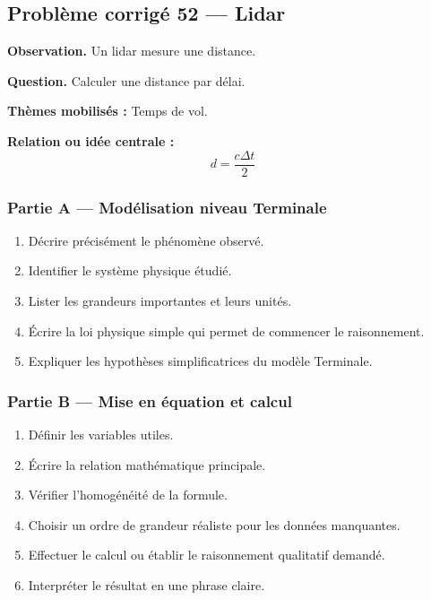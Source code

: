 \documentclass[11pt,a4paper]{article}
\begin{document}
\subsection{Problème corrigé 52 — Lidar}

\begin{exercicebox}
\textbf{Observation.} Un lidar mesure une distance.

\medskip
\textbf{Question.} Calculer une distance par délai.

\medskip
\textbf{Thèmes mobilisés :} Temps de vol.

\medskip
\textbf{Relation ou idée centrale :}
\[
d=\frac{c\Delta t}{2}
\]
\end{exercicebox}

\subsubsection*{Partie A — Modélisation niveau Terminale}

\begin{enumerate}
  \item Décrire précisément le phénomène observé.
  \item Identifier le système physique étudié.
  \item Lister les grandeurs importantes et leurs unités.
  \item Écrire la loi physique simple qui permet de commencer le raisonnement.
  \item Expliquer les hypothèses simplificatrices du modèle Terminale.
\end{enumerate}

\subsubsection*{Partie B — Mise en équation et calcul}

\begin{enumerate}
  \item Définir les variables utiles.
  \item Écrire la relation mathématique principale.
  \item Vérifier l'homogénéité de la formule.
  \item Choisir un ordre de grandeur réaliste pour les données manquantes.
  \item Effectuer le calcul ou établir le raisonnement qualitatif demandé.
  \item Interpréter le résultat en une phrase claire.
\end{enumerate}
\end{document}
